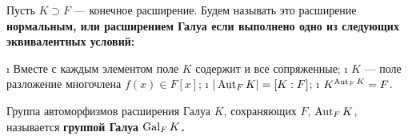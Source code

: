 \begin{defn}
Пусть \(K \supset F\) --- конечное расширение. Будем называть это расширение \bf{нормальным}, или \bf{расширением Галуа} если выполнено одно из следующих эквивалентных условий:

\begin{enumerate}
\def\labelenumi{(\arabic{enumi})}
\tightlist
\i
  Вместе с каждым элементом поле \(K\) содержит и все сопряженные;
\i
  \(K\) --- поле разложение многочлена \(f(x) \in F[x]\);
\i
  \(|\operatorname{Aut}_F{K}| = [K:F]\);
\i
  \(K^{\operatorname{Aut}_F{K}}=F\).
\end{enumerate}

\end{defn}

\begin{defn}
Группа автоморфизмов расширения Галуа \(K\), сохраняющих \(F\), \(\operatorname{Aut}_FK\), называется \bf{группой Галуа} \(\operatorname{Gal}_FK\).
\end{defn}


